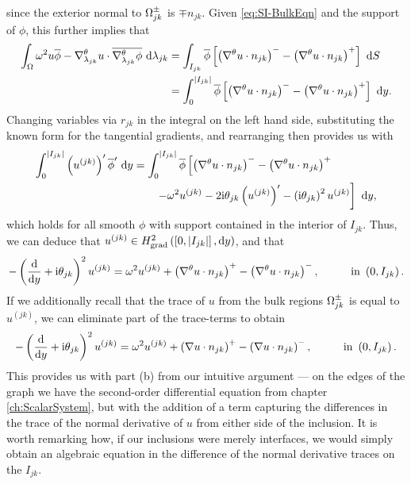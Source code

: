 since the exterior normal to $\Omega_{jk}^{\pm}$ is $\mp n_{jk}$.
Given \eqref{eq:SI-BulkEqn} and the support of $\phi$, this further implies that
\begin{align*}
	\int_{\Omega} \omega^2 u\overline{\phi} - \nabla^{\theta}_{\lambda_{jk}}u\cdot\overline{\nabla^{\theta}_{\lambda_{jk}}\phi}  \ \mathrm{d}\lambda_{jk}
	&= \int_{I_{jk}} \overline{\phi}\left[ \left( \nabla^{\theta} u\cdot n_{jk} \right)^- - \left( \nabla^{\theta} u\cdot n_{jk} \right)^+ \right]  \ \mathrm{d}S \\
	&= \int_0^{\left\lvert I_{jk} \right\rvert} \overline{\phi}\left[ \left( \nabla^{\theta} u\cdot n_{jk} \right)^- - \left( \nabla^{\theta} u\cdot n_{jk} \right)^+ \right] \ \mathrm{d} y.
\end{align*}
Changing variables via $r_{jk}$ in the integral on the left hand side, substituting the known form for the tangential gradients, and rearranging then provides us with
\begin{align*}
	\int_0^{\left\lvert I_{jk} \right\rvert} \left( u^{(jk)} \right)'\overline{\phi}' \ \mathrm{d} y
	&= \int_0^{\left\lvert I_{jk} \right\rvert} \overline{\phi}\left[  \left( \nabla^{\theta} u\cdot n_{jk} \right)^- - \left( \nabla^{\theta} u\cdot n_{jk} \right)^+ \right. \\
	&\qquad \left. - \omega^2 u^{(jk)} - 2\mathrm{i}\theta_{jk}\left( u^{(jk)} \right)' - \left( \mathrm{i}\theta_{jk} \right)^2 u^{(jk)}  \right] \ \mathrm{d} y,
\end{align*}
which holds for all smooth $\phi$ with support contained in the interior of $I_{jk}$.
Thus, we can deduce that $u^{(jk)}\in H^2_\mathrm{grad}\left( \left[ 0,\left\lvert I_{jk} \right\rvert \right], \mathrm{d}y \right)$, and that
\begin{align*}
	- \left( \dfrac{\mathrm{d}}{\mathrm{d}y} + \mathrm{i}\theta_{jk} \right)^2u^{(jk)} 
	&= \omega^2 u^{(jk)} + \left( \nabla^{\theta} u\cdot n_{jk} \right)^+ - \left( \nabla^{\theta} u\cdot n_{jk} \right)^-,
	&\qquad\text{in } \left( 0,I_{jk} \right).
\end{align*}
If we additionally recall that the trace of $u$ from the bulk regions $\Omega_{jk}^{\pm}$ is equal to $u^{(jk)}$, we can eliminate part of the trace-terms to obtain
\begin{align} \label{eq:SI-InclusionEqn}
	- \left( \dfrac{\mathrm{d}}{\mathrm{d}y} + \mathrm{i}\theta_{jk} \right)^2u^{(jk)} 
	&= \omega^2 u^{(jk)} + \left( \nabla u\cdot n_{jk} \right)^+ - \left( \nabla u\cdot n_{jk} \right)^-,
	&\qquad\text{in } \left( 0,I_{jk} \right).
\end{align}
This provides us with part (b) from our intuitive argument --- on the edges of the graph we have the second-order differential equation from chapter \ref{ch:ScalarSystem}, but with the addition of a term capturing the differences in the trace of the normal derivative of $u$ from either side of the inclusion.
It is worth remarking how, if our inclusions were merely interfaces, we would simply obtain an algebraic equation in the difference of the normal derivative traces on the $I_{jk}$.

